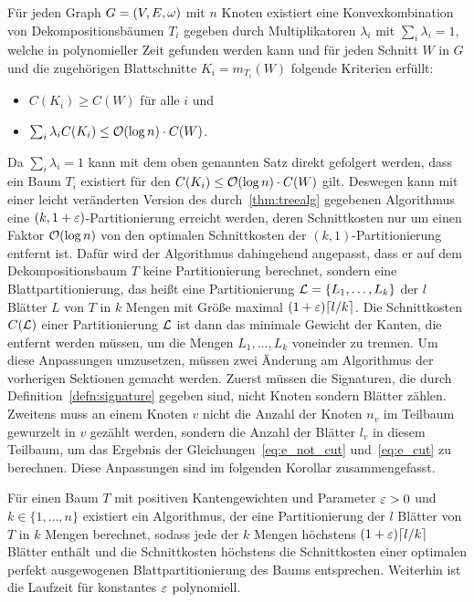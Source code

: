 \begin{thm}\label{thm:decomptrees}
    Für jeden Graph $G=(V, E, \omega)$ mit $n$ Knoten existiert eine Konvexkombination von Dekompositionsbäumen $T_i$ gegeben durch Multiplikatoren $\lambda_i$ mit $\sum_i \lambda_i = 1$, welche in polynomieller Zeit gefunden werden kann und für jeden Schnitt $W$ in $G$ und die zugehörigen Blattschnitte $K_i = m_{T_i}(W)$ folgende Kriterien erfüllt:
    \begin{itemize}
        \item $C(K_i) \geq C(W)$ für alle $i$ und
        \item $\sum_i \lambda_i C(K_i) \leq \mathcal{O}(\log n) \cdot C(W)$.
    \end{itemize}
\end{thm}

Da $\sum_i \lambda_i = 1$ kann mit dem oben genannten Satz direkt gefolgert werden, dass ein Baum $T_i$ existiert für den $C(K_i) \leq \mathcal{O}(\log n) \cdot C(W)$ gilt.
Deswegen kann mit einer leicht veränderten Version des durch~\ref{thm:treealg} gegebenen Algorithmus eine $(k,1 + \varepsilon)$\hyp Partitionierung erreicht werden, deren Schnittkosten nur um einen Faktor $\mathcal{O}(\log n)$ von den optimalen Schnittkosten der $(k, 1)$\hyp Partitionierung entfernt ist.
Dafür wird der Algorithmus dahingehend angepasst, dass er auf dem Dekompositionsbaum $T$ keine Partitionierung berechnet, sondern eine Blattpartitionierung, das heißt eine Partitionierung $\mathcal{L} = \{L_1, \ldots, L_k\}$ der $l$ Blätter $L$ von $T$ in $k$ Mengen mit Größe maximal $(1 + \eps) \ceil*{l/k}$.
Die Schnittkosten $C(\mathcal{L})$ einer Partitionierung $\mathcal{L}$ ist dann das minimale Gewicht der Kanten, die entfernt werden müssen, um die Mengen $L_1, \ldots, L_k$ voneinder zu trennen.
Um diese Anpassungen umzusetzen, müssen zwei Änderung am Algorithmus der vorherigen Sektionen gemacht werden. 
Zuerst müssen die Signaturen, die durch Definition~\ref{defn:signature} gegeben sind, nicht Knoten sondern Blätter zählen.
Zweitens muss an einem Knoten $v$ nicht die Anzahl der Knoten $n_v$ im Teilbaum gewurzelt in $v$ gezählt werden, sondern die Anzahl der Blätter $l_v$ in diesem Teilbaum, um das Ergebnis der Gleichungen~\eqref{eq:e_not_cut} und~\eqref{eq:e_cut} zu berechnen. 
Diese Anpassungen sind im folgenden Korollar zusammengefasst.\\

\begin{cor}\label{cor:leafpartitioning}
        Für einen Baum $T$ mit positiven Kantengewichten und Parameter $\varepsilon > 0$ und $k \in \{1, \ldots, n\}$ existiert ein Algorithmus, der eine Partitionierung der $l$ Blätter von $T$ in $k$ Mengen berechnet, sodass jede der $k$ Mengen höchstens $(1 + \eps) \ceil*{l/k}$ Blätter enthält und die Schnittkosten höchstens die Schnittkosten einer optimalen perfekt ausgewogenen Blattpartitionierung des Baums entsprechen. 
        Weiterhin ist die Laufzeit für konstantes $\varepsilon$ polynomiell.
\end{cor}

